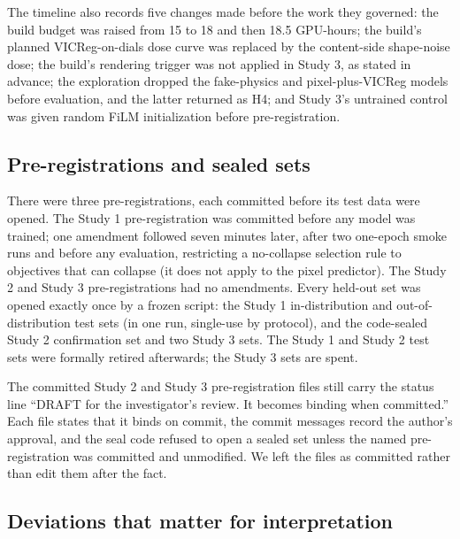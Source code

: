 \documentclass[10pt]{article}
\begin{document}
The timeline also records five changes made before the work they governed: the build budget was raised from 15 to 18 and then 18.5 GPU-hours; the build's planned VICReg-on-dials dose curve was replaced by the content-side shape-noise dose; the build's rendering trigger was not applied in Study 3, as stated in advance; the exploration dropped the fake-physics and pixel-plus-VICReg models before evaluation, and the latter returned as H4; and Study 3's untrained control was given random FiLM initialization before pre-registration.

\subsection{Pre-registrations and sealed sets}\label{sec:8.1}

There were three pre-registrations, each committed before its test data were opened. The Study 1 pre-registration was committed before any model was trained; one amendment followed seven minutes later, after two one-epoch smoke runs and before any evaluation, restricting a no-collapse selection rule to objectives that can collapse (it does not apply to the pixel predictor). The Study 2 and Study 3 pre-registrations had no amendments. Every held-out set was opened exactly once by a frozen script: the Study 1 in-distribution and out-of-distribution test sets (in one run, single-use by protocol), and the code-sealed Study 2 confirmation set and two Study 3 sets. The Study 1 and Study 2 test sets were formally retired afterwards; the Study 3 sets are spent.

The committed Study 2 and Study 3 pre-registration files still carry the status line ``DRAFT for the investigator's review. It becomes binding when committed.'' Each file states that it binds on commit, the commit messages record the author's approval, and the seal code refused to open a sealed set unless the named pre-registration was committed and unmodified. We left the files as committed rather than edit them after the fact.

\subsection{Deviations that matter for interpretation}\label{sec:8.2}
\end{document}
